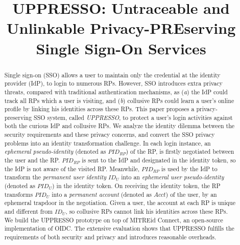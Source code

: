 \documentclass[letterpaper,twocolumn,10pt]{article}
\begin{document}
\title{UPPRESSO: Untraceable and Unlinkable Privacy-PREserving\\Single Sign-On Services}


\maketitle
\begin{abstract}
Single sign-on (SSO) allows a user to maintain only the credential at the identity provider (IdP),
    to login to numerous RPs.
However, SSO introduces extra privacy threats, compared with traditional authentication mechanisms,
 as (\emph{a}) the IdP could track all RPs which a user is visiting,
 and (\emph{b}) collusive RPs could learn a user's online profile by linking his identities across these RPs.
%
This paper proposes a privacy-preserving SSO system, called \emph{UPPRESSO},
 to protect a user's login activities against both the curious IdP and collusive RPs.
We analyze the identity dilemma between the security requirements and these privacy concerns,
    and convert the SSO privacy problems into an identity transformation challenge.
In each login instance, %
    an \emph{ephemeral pseudo-identity} (denoted as $PID_{RP}$) of the RP,
        is firstly negotiated between the user and the RP.
$PID_{RP}$ is sent to the IdP and designated in the identity token,
        so the IdP is not aware of the visited RP.
Meanwhile,
    $PID_{RP}$ is used by the IdP to transform the \emph{permanent user identity} $ID_U$
        into an \emph{ephemeral user pseudo-identity} (denoted as $PID_U$)
        in the identity token.
On receiving the identity token,
    the RP transforms $PID_U$ into a \emph{permanent account} (denoted as $Acct$) of the user,
     by an ephemeral trapdoor in the negotiation.
Given a user, the account at each RP is unique and different from $ID_U$,
    so collusive RPs cannot link his identities across these RPs.
%
We build the UPPRESSO prototype %
    on top of MITREid Connect, an open-source implementation of OIDC.
The extensive evaluation shows that UPPRESSO
        fulfills the requirements of both security and privacy
        and introduces reasonable overheads.
\end{abstract}
\end{document}
